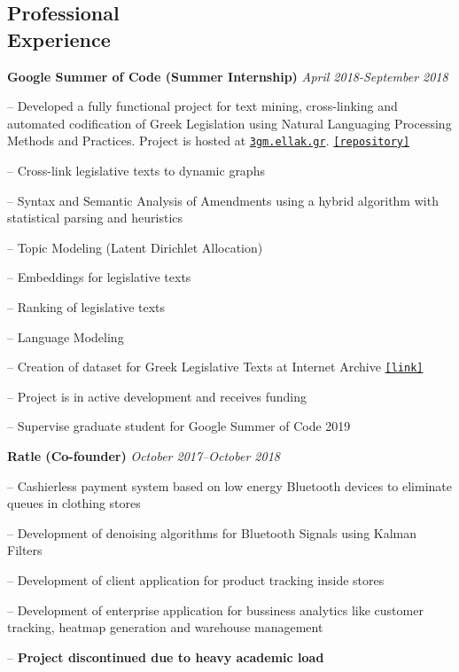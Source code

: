 \documentclass[margin]{res}
\newcommand{\field}[2]{\noindent \textbf{#1} \hfill #2 \\}
\begin{document}
\begin{resume}
\section{Professional \\ Experience}
\field{Google Summer of Code (Summer Internship)}  {\emph{April 2018-September 2018}}
\begin{compactitem}
\item[--] Developed a fully functional project for text mining, cross-linking and automated codification of Greek Legislation using Natural Languaging Processing Methods and Practices. Project is hosted at \href{https://3gm.ellak.gr}{\nolinkurl{3gm.ellak.gr}}. \href{https://github.com/eellak/gsoc2018-3gm}{\nolinkurl{[repository]}}
\begin{compactitem}
\item[--] Cross-link legislative texts to dynamic graphs
\item[--] Syntax and Semantic Analysis of Amendments using a hybrid algorithm with statistical parsing and heuristics
\item[--] Topic Modeling (Latent Dirichlet Allocation)
\item[--] Embeddings for legislative texts
\item[--] Ranking of legislative texts
\item[--] Language Modeling
\item[--] Creation of dataset for Greek Legislative Texts at Internet Archive \href{https://archive.org/details/greekgovernmentgazette}{\nolinkurl{[link]}}
\end{compactitem} 
\item[--] Project is in active development and receives funding
\item[--] Supervise graduate student for Google Summer of Code 2019 
\end{compactitem}

\field{Ratle (Co-founder)} {\emph{October 2017--October 2018}}
\begin{compactitem}
\item[--] Cashierless payment system based on low energy Bluetooth devices to eliminate queues in clothing stores
\item[--] Development of denoising algorithms for Bluetooth Signals using Kalman Filters 
\item[--] Development of client application for product tracking inside stores
\item[--] Development of enterprise application for bussiness analytics like customer tracking, heatmap generation and warehouse management
\item[--] \textbf{Project discontinued due to heavy academic load}
\end{compactitem}



\end{resume}
\end{document}
